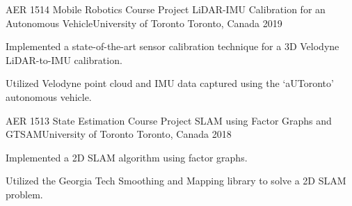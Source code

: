 

\begin{cventries}

  \cventry
    {AER 1514 Mobile Robotics Course Project} %
    {LiDAR-IMU Calibration for an Autonomous Vehicle{\enskip\cdotp\enskip}University of Toronto} %
    {Toronto, Canada} %
    {2019} %
    {
      \begin{cvitems} %
        \item {Implemented a state-of-the-art sensor calibration technique for a 3D Velodyne LiDAR-to-IMU calibration.}
        \item {Utilized Velodyne point cloud and IMU data captured using the `aUToronto' autonomous vehicle.}
      \end{cvitems}
    }
    
  \cventry
    {AER 1513 State Estimation Course Project} %
    {SLAM using Factor Graphs and GTSAM{\enskip\cdotp\enskip}University of Toronto} %
    {Toronto, Canada} %
    {2018} %
    {
      \begin{cvitems} %
        \item {Implemented a 2D SLAM algorithm using factor graphs.}
        \item {Utilized the Georgia Tech Smoothing and Mapping library to solve a 2D SLAM problem.}
      \end{cvitems}
    }

\end{cventries}
